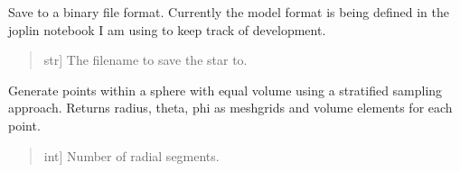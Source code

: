 \documentclass[letterpaper,10pt,english]{sphinxmanual}
\begin{document}
\begin{fulllineitems}
\begin{fulllineitems}
\label{\detokenize{CoolDwarf.star:CoolDwarf.star.sphere.VoxelSphere.save}}
\pysigstartsignatures
{}
\pysigstopsignatures
\sphinxAtStartPar
Save to a binary file format. Currently the model format is being defined in the joplin notebook I am using to keep track of development.
\begin{quote}\begin{description}
\begin{description}
\sphinxlineitem{\sphinxstylestrong{filename}}{[}str{]}
\sphinxAtStartPar
The filename to save the star to.

\end{description}

\begin{description}
\end{description}

\end{description}\end{quote}

\end{fulllineitems}


\begin{fulllineitems}
\label{\detokenize{CoolDwarf.star:CoolDwarf.star.sphere.VoxelSphere.spherical_grid_equal_volume}}
\pysigstartsignatures
{}
\pysigstopsignatures
\sphinxAtStartPar
Generate points within a sphere with equal volume using a stratified sampling approach.
Returns radius, theta, phi as meshgrids and volume elements for each point.
\begin{quote}\begin{description}
\begin{description}
\sphinxlineitem{\sphinxstylestrong{numRadial}}{[}int{]}
\sphinxAtStartPar
Number of radial segments.


\end{description}
\end{description}
\end{quote}
\end{fulllineitems}
\end{fulllineitems}
\end{document}
